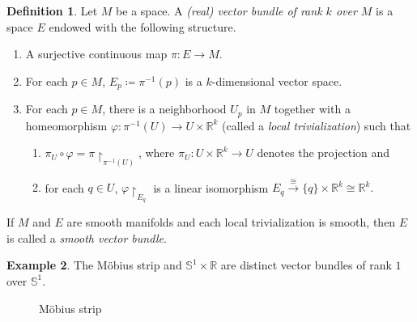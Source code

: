 \documentclass[10pt,letterpaper,cm]{nupset}
\theoremstyle{definition}
\newtheorem{definition}{Definition}[subsection]
\newtheorem{exmp}[definition]{Example}
\theoremstyle{theorem}
\theoremstyle{remark}
\newcommand{\R}{\mathbb R}
\renewcommand{\S}{\mathbb S}
\newcommand{\1}{\mathbf{1}}
\newcommand{\0}{\vec 0}
\begin{document}
\begin{definition}
Let $M$ be a space. A \textit{(real) vector bundle of rank $k$ over $M$} is a space $E$ endowed with the following structure.
\begin{enumerate}[label=(\Roman*)]
\item A surjective continuous map $\pi : E \to M$.
\item For each $p \in M$, $E_p\coloneqq  \pi^{-1}(p)$ is a $k$-dimensional vector space.
\item For each $p\in M$, there is a neighborhood $U_p$ in $M$ together with a homeomorphism $\varphi :\pi^{-1}(U) \to U \times \R^k$ (called a \textit{local trivialization}) such that
\begin{enumerate}
\item $\pi_U \circ \varphi  = \pi \restriction_{\pi^{-1}(U)}$, where $\pi_U : U \times \R^k \to U$ denotes the projection and
\item for each $q\in U$, $\varphi \restriction_{E_q}$ is a linear isomorphism $E_q \overset{\cong}{\longrightarrow} \{q\} \times \R^k \cong \R^k.$
\end{enumerate}
\end{enumerate}
If $M$ and $E$ are smooth manifolds and each local trivialization  is smooth, then $E$ is called a \textit{smooth vector bundle}.
\end{definition}

\begin{exmp}
The M\"obius strip and $\S^1 \times \R$ are distinct vector bundles of rank $1$ over $\S^1$.

\begin{figure}[h]
\centering
{}
\caption{M\"obius strip} 
\end{figure}

\end{exmp}
\end{document}
